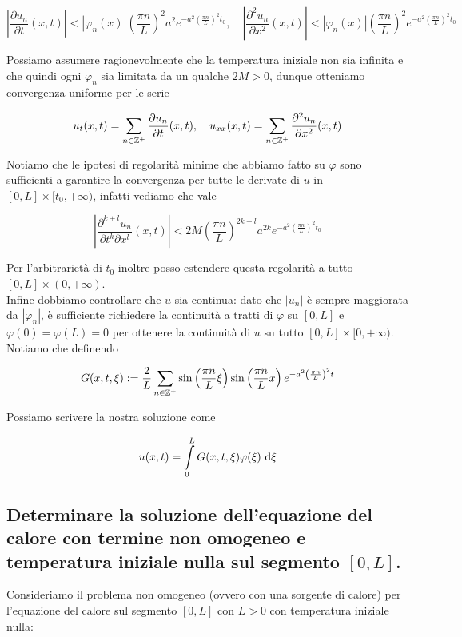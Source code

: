 \documentclass{article}
\begin{document}
\[ \left| \frac{\partial u_n}{\partial t}(x,t) \right| < |\varphi_n(x)| \left(\frac{\pi n}{L}\right)^{2} a^{2} e^{- a^2 \left( \frac{\pi n}{L}\right)^2 t_0 },\quad \left| \frac{\partial^{2}u_n}{ \partial x^2}(x,t) \right| < |\varphi_n(x)| \left(\frac{\pi n}{L}\right)^{2} e^{- a^2 \left( \frac{\pi n}{L}\right)^2 t_0 } \]

Possiamo assumere ragionevolmente che la temperatura iniziale non sia infinita e che quindi ogni $\varphi_n$ sia limitata da un qualche $2M > 0$, dunque otteniamo convergenza uniforme per le serie 

\[ u_t(x,t) = \sum_{n\in \mathbb{Z}^+} \frac{\partial u_n}{\partial t}(x,t), \quad u_{xx}(x,t) = \sum_{n\in \mathbb{Z}^+} \frac{\partial^2 u_n}{\partial x^2}(x,t) \]

Notiamo che le ipotesi di regolarità minime che abbiamo fatto su $\varphi$ sono sufficienti a garantire la convergenza per tutte le derivate di $u$ in $[0,L]\times [t_0, +\infty)$, infatti vediamo che vale

\[ \left| \frac{\partial^{k+l}u_n}{\partial t^k \partial x^l}(x,t) \right| < 2M \left(\frac{\pi n}{L}\right)^{2k+l} a^{2k} e^{- a^2 \left( \frac{\pi n}{L}\right)^2 t_0 } \]

Per l'arbitrarietà di $t_0$ inoltre posso estendere questa regolarità a tutto $[0,L]\times (0,+\infty)$.\\
Infine dobbiamo controllare che $u$ sia continua: dato che $|u_n|$ è sempre maggiorata da $|\varphi_n|$, è sufficiente richiedere la continuità a tratti di $\varphi$ su $[0,L]$ e $\varphi(0)=\varphi(L) = 0$ per ottenere la continuità di $u$ su tutto $[0,L]\times [0,+\infty)$. Notiamo che definendo

\[ G(x,t,\xi) := \frac{2}{L}\sum_{n \in \mathbb{Z}^+} \sin\left( \frac{\pi n}{L}\xi \right)\sin\left( \frac{\pi n}{L}x \right) e^{-a^2 \left( \frac{\pi n}{L} \right)^2 t}\] 

Possiamo scrivere la nostra soluzione come 

\[ u(x,t)=  \intop_0^L  G(x,t,\xi)\varphi(\xi) \de\xi \]

\subsection{Determinare la soluzione dell'equazione del calore con termine non omogeneo e temperatura iniziale nulla sul segmento $[0,L]$.}

Consideriamo il problema non omogeneo (ovvero con una sorgente di calore) per l'equazione del calore sul segmento $[0,L]$ con $L>0$ con temperatura iniziale nulla:
\end{document}
